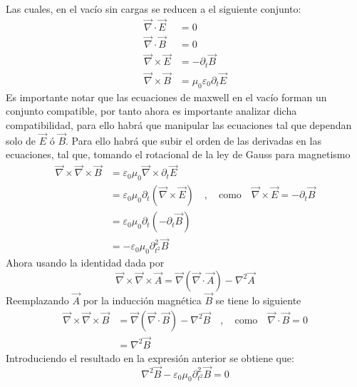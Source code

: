 \documentclass[../main.tex]{subfiles}
\begin{document}
Las cuales, en el vacío sin cargas se reducen a el siguiente conjunto:
\begin{equation}
    \begin{aligned}
        \vec{\nabla} \cdot \vec{E}& = 0 \\
        \vec{\nabla} \cdot \vec{B}& = 0 \\
        \vec{\nabla} \times \vec{E} & = -\partial_t \vec{B} \\
        \vec{\nabla} \times \vec{B} & = \mu_0  \varepsilon_0 \partial_t \vec{E}
    \end{aligned}
\end{equation}
Es importante notar que las ecuaciones de maxwell en el vacío forman un conjunto compatible, por tanto ahora es importante analizar dicha compatibilidad, para ello habrá que manipular las ecuaciones tal que dependan solo de $\vec{E}$ ó $\vec{B}$.
Para ello habrá que subir el orden de las derivadas en las ecuaciones, tal que, tomando el rotacional de la ley de Gauss para magnetismo
\begin{align*}
    \vec{\nabla} \times \vec{\nabla} \times \vec{B} & = \varepsilon_0 \mu_0 \vec{\nabla} \times \partial_t \vec{E} \\
    & = \varepsilon_0 \mu_0 \partial_t (\vec{\nabla} \times \vec{E}) \quad , \quad \text{como} \quad \vec{\nabla} \times \vec{E}  = -\partial_t \vec{B} \\
    & = \varepsilon_0 \mu_0 \partial_t (- \partial_t \vec{B}) \\
    & = - \varepsilon_0 \mu_0 \partial^2_{t^2} \vec{B}
\end{align*}
Ahora usando la identidad dada por
\begin{equation} \label{identidad-rotacional}
     \vec{\nabla} \times \vec{\nabla} \times \vec{A}=\vec{\nabla} (\vec{\nabla}\cdot \vec{A}) - \nabla^2\vec{A}
\end{equation}
Reemplazando $\vec{A}$ por la inducción magnética $\vec{B}$ se tiene lo siguiente
\begin{align*}
        \vec{\nabla} \times \vec{\nabla} \times \vec{B} & = \vec{\nabla} (\vec{\nabla}\cdot \vec{B}) - \nabla^2\vec{B} \quad , \quad \text{como} \quad \vec{\nabla} \cdot \vec{B} = 0 \\
        & = \nabla^2\vec{B}
\end{align*}
Introduciendo el resultado en la expresión anterior se obtiene que: 
\begin{equation} \label{onda-mag}
    \nabla^2\vec{B}-\varepsilon_0\mu_0 \partial^2_{t^2}\vec{B}=0 
\end{equation}
\end{document}
